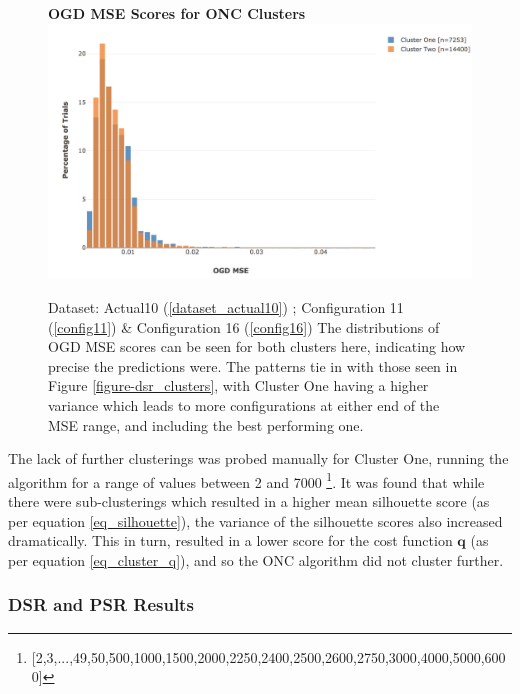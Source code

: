 \documentclass[a4paper,11pt,oneside]{article}
\theoremstyle{plain}
\theoremstyle{definition}
\begin{document}
	\begin{figure}[H]
		\centering
		\textbf{OGD MSE Scores for ONC Clusters}
		\includegraphics[scale=0.4]{images/results/dsr/cluster_distributions_mse.png} 
		\caption[OGD MSE Scores for ONC Clusters]{Dataset: Actual10 (\ref{dataset_actual10}) ; Configuration 11 (\ref{config11}) \&  Configuration 16 (\ref{config16})
			\newline The distributions of OGD MSE scores can be seen for both clusters here, indicating how precise the predictions were. The patterns tie in with those seen in Figure \ref{figure-dsr_clusters}, with Cluster One having a higher variance which leads to more configurations at either end of the MSE range, and including the best performing one.}
		\label{figure-dsr_clusters_mse}
	\end{figure}
	
	The lack of further clusterings was probed manually for Cluster One, running the algorithm for a range of values between 2 and 7000 \footnote{[2,3,...,49,50,500,1000,1500,2000,2250,2400,2500,2600,2750,3000,4000,5000,6000]}. It was found that while there were sub-clusterings which resulted in a higher mean silhouette score (as per equation \eqref{eq_silhouette}), the variance of the silhouette scores also increased dramatically. This in turn, resulted in a lower score for the cost function $\mathbf{q}$ (as per equation \eqref{eq_cluster_q}), and so the ONC algorithm did not cluster further.
	
	\subsubsection{DSR and PSR Results}\label{results_dsr2}
	
\end{document}
